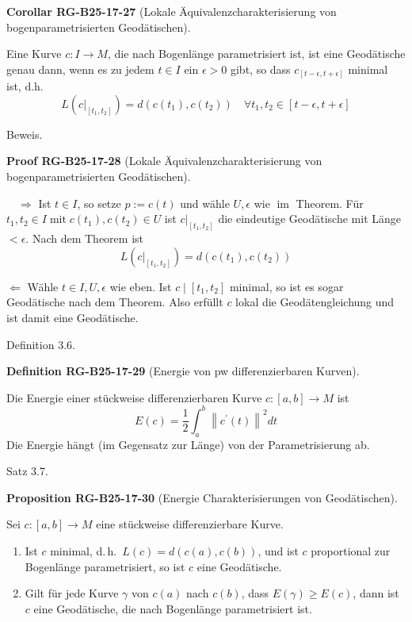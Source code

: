 \documentclass[10pt, letterpaper]{article}
\newcommand{\CustomHeading}[3]{%
  \par\medskip\noindent%
  \textbf{#1 #2} \textnormal{(#3)}.\enskip%
}
\newenvironment{DEF}[2]{\begin{unitbox}\CustomHeading{Definition}{#1}{#2}}{\end{unitbox}}
\newenvironment{PROP}[2]{\begin{unitbox}\CustomHeading{Proposition}{#1}{#2}}{\end{unitbox}}
\newenvironment{KORO}[2]{\begin{unitbox}\CustomHeading{Corollar}{#1}{#2}}{\end{unitbox}}
\newenvironment{PROOF}[2]{\begin{unitbox}\CustomHeading{Proof}{#1}{#2}}{\end{unitbox}}
\begin{document}
\begin{KORO}{RG-B25-17-27}{Lokale Äquivalenzcharakterisierung von bogenparametrisierten Geodätischen}
Eine Kurve $c: I \rightarrow M$, die nach Bogenlänge parametrisiert ist, ist eine Geodätische genau dann, wenn es zu jedem $t \in I$ ein $\epsilon>0$ gibt, so dass $c_{[t-\epsilon, t+\epsilon]}$ minimal ist, d.h.
$$
L\left(\left.c\right|_{\left[t_{1}, t_{2}\right]}\right)=d\left(c\left(t_{1}\right), c\left(t_{2}\right)\right) \quad \forall t_{1}, t_{2} \in[t-\epsilon, t+\epsilon]
$$
\end{KORO}



Beweis. 

\begin{PROOF}{RG-B25-17-28}{Lokale Äquivalenzcharakterisierung von bogenparametrisierten Geodätischen}
$\quad \Longrightarrow$ Ist $t \in I$, so setze $p:=c(t)$ und wähle $U, \epsilon$ wie $\operatorname{im}$ Theorem. Für $t_{1}, t_{2} \in I \operatorname{mit} c\left(t_{1}\right), c\left(t_{2}\right) \in U$ ist $\left.c\right|_{\left[t_{1}, t_{2}\right]}$ die eindeutige Geodätische mit Länge $<\epsilon$. Nach dem Theorem ist $$L\left(\left.c\right|_{\left[t_{1}, t_{2}\right]}\right)=d\left(c\left(t_{1}\right), c\left(t_{2}\right)\right)$$

$\Longleftarrow$ Wähle $t \in I, U, \epsilon$ wie eben. Ist $c \mid\left[t_{1}, t_{2}\right]$ minimal, so ist es sogar Geodätische nach dem Theorem. Also erfüllt $c$ lokal die Geodätengleichung und ist damit eine Geodätische.
\end{PROOF}



Definition 3.6. 


\begin{DEF}{RG-B25-17-29}{Energie von pw differenzierbaren Kurven}
Die Energie einer stückweise differenzierbaren Kurve $c:[a, b] \rightarrow M$ ist
$$
E(c)=\frac{1}{2} \int_{a}^{b}\left\|c^{\prime}(t)\right\|^{2} d t
$$
Die Energie hängt (im Gegensatz zur Länge) von der Parametrisierung ab.
\end{DEF}



Satz 3.7. 


\begin{PROP}{RG-B25-17-30}{Energie Charakterisierungen von Geodätischen}
Sei $c:[a, b] \rightarrow M$ eine stückweise differenzierbare Kurve.
\begin{enumerate}
  \item Ist $c$ minimal, d.\,h.\ $L(c) = d(c(a), c(b))$, und ist $c$ proportional zur Bogenlänge parametrisiert, so ist $c$ eine Geodätische.

  \item Gilt für jede Kurve $\gamma$ von $c(a)$ nach $c(b)$, dass $E(\gamma) \geq E(c)$, dann ist $c$ eine Geodätische, die nach Bogenlänge parametrisiert ist.
\end{enumerate}
\end{PROP}
\end{document}
